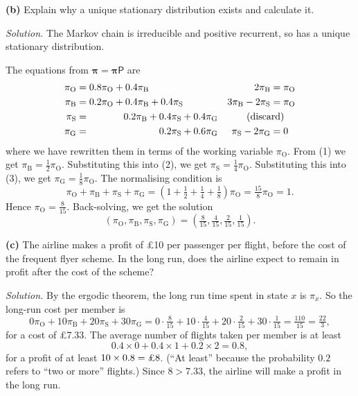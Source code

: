 \documentclass[
  a4paper,
]{article}
\theoremstyle{definition}
\theoremstyle{definition}
\theoremstyle{definition}
\theoremstyle{remark}
\begin{document}
\textbf{(b)} Explain why a unique stationary distribution exists and calculate it.

\begin{myanswers}

\emph{Solution.}
The Markov chain is irreducible and positive recurrent, so has a unique stationary distribution.

The equations from \(\boldsymbol\pi = \boldsymbol\pi \mathsf P\) are
\begin{align}
    \pi_{\mathrm O} &= 0.8 \pi_{\mathrm O} + 0.4 \pi_{\mathrm B } & 2\pi_{\mathrm B} &= \pi_{\mathrm O} \\
    \pi_{\mathrm B} &= 0.2\pi_{\mathrm O} + 0.4\pi_{\mathrm B} + 0.4\pi_{\mathrm S} & 3\pi_{\mathrm B} - 2\pi_{\mathrm S} &= \pi_{\mathrm O} \\
    \pi_{\mathrm S} &= \phantom{0.2 \pi_{\mathrm S} +{}} 0.2 \pi_{\mathrm B} + 0.4 \pi_{\mathrm S} + 0.4 \pi_{\mathrm G} & \text{(discard)} \hspace{-0.5cm} & \notag \\
    \pi_{\mathrm G} &= \phantom{0.2 \pi_{\mathrm S} + 0.2 \pi_{\mathrm B} +{}} 0.2 \pi_{\mathrm S} + 0.6 \pi_{\mathrm G} &  \pi_{\mathrm S} - 2 \pi_{\mathrm G} &= 0
    \end{align}
where we have rewritten them in terms of the working variable \(\pi_{\mathrm O}\). From (1) we get \(\pi_{\mathrm B} = \frac12\pi_{\mathrm O}\). Substituting this into (2), we get \(\pi_{\mathrm S} = \frac14\pi_{\mathrm O}\). Substituting this into (3), we get \(\pi_{\mathrm G} = \frac18\pi_{\mathrm O}\). The normalising condition is
\[ \pi_{\mathrm O} + \pi_{\mathrm B} + \pi_{\mathrm S} + \pi_{\mathrm G} = \left(1 + \tfrac12 + \tfrac14 + \tfrac18\right)\pi_{\mathrm O} = \tfrac{15}{8} \pi_{\mathrm O} = 1 . \]
Hence \(\pi_{\mathrm O} = \frac{8}{15}\). Back-solving, we get the solution
\[ \left(\pi_{\mathrm O},\pi_{\mathrm B},\pi_{\mathrm S},\pi_{\mathrm G}\right) = \left(\tfrac8{15},\tfrac{4}{15},\tfrac{2}{15},\tfrac{1}{15} \right) . \]

\end{myanswers}

\textbf{(c)} The airline makes a profit of £10 per passenger per flight, before the cost of the frequent flyer scheme. In the long run, does the airline expect to remain in profit after the cost of the scheme?

\begin{myanswers}

\emph{Solution.}
By the ergodic theorem, the long run time spent in state \(x\) is \(\pi_x\). So the long-run cost per member is
\[ 0\pi_{\mathrm O} + 10\pi_{\mathrm B} + 20 \pi_{\mathrm S} + 30\pi_{\mathrm G}
    = 0 \cdot\tfrac8{15} + 10\cdot\tfrac{4}{15} + 20\cdot\tfrac{2}{15} + 30 \cdot \tfrac{1}{15} = \tfrac{110}{15} = \tfrac{22}{3} , \]
for a cost of \pounds 7.33.
The average number of flights taken per member is at least
\[ 0.4\times 0 + 0.4 \times 1 + 0.2\times 2 = 0.8 , \]
for a profit of at least \(10\times0.8 = \text{\pounds}8\). (``At least'' because the probability \(0.2\) refers to ``two or more'' flights.) Since \(8 >7.33\), the airline will make a profit in the long run.

\end{myanswers}
\end{document}
